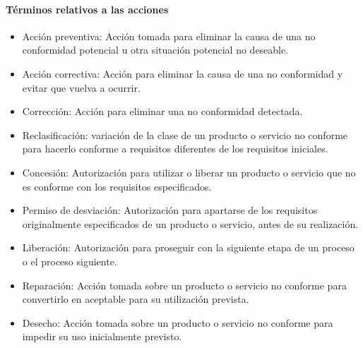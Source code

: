 				\paragraph{Términos relativos a las acciones}
					\begin{itemize}
						\item Acción preventiva: Acción tomada para eliminar la causa de una no conformidad potencial u otra situación potencial
						no deseable.
						
						\item Acción correctiva: Acción para eliminar la causa de una no conformidad y evitar que vuelva a ocurrir.
						
						\item Corrección: Acción para eliminar una no conformidad detectada.
						
						\item Reclasificación: variación de la clase de un producto o servicio no conforme para hacerlo
						conforme a requisitos diferentes de los requisitos iniciales.
						
						\newpage
						\thispagestyle{plain}
						
						\item  Concesión: Autorización para utilizar o liberar un producto o servicio que no es conforme con los requisitos especificados.
						
						\item Permiso de desviación: Autorización para apartarse de los requisitos originalmente especificados de un producto 
						o servicio, antes de su realización.
						
						\item Liberación: Autorización para proseguir con la siguiente etapa de un proceso o el proceso siguiente.
						
						\item Reparación: Acción tomada sobre un producto o servicio no conforme para convertirlo en aceptable para su utilización prevista.
						
						\item Desecho: Acción tomada sobre un producto o servicio no conforme para impedir su uso
						inicialmente previsto.
					\end{itemize}
				